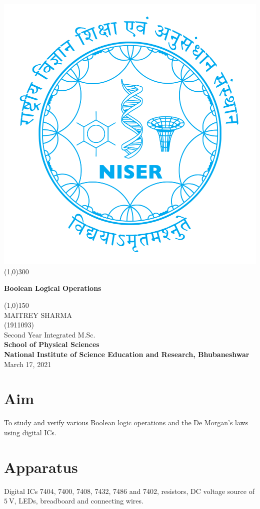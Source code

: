 \begin{titlepage}
\begin{center}
\includegraphics[scale=0.15]{Documents/niser.png}
\line(1,0){300}\\
[2mm]
\begin{large}
\textbf{\huge Boolean Logical Operations}\\ 
\end{large}
\line(1,0){150}\\
[5cm]
\large MAITREY SHARMA\\
\small (1911093)\\
[4.5cm]
Second Year Integrated M.Sc.\\
\textbf{School of Physical Sciences}\\
\textbf{National Institute of Science Education and Research, Bhubaneshwar}\\
\small March 17, 2021
\end{center} 
\end{titlepage}
\newpage
\section{Aim}
\noindent To study and verify various Boolean logic operations and the De Morgan’s 
laws using digital ICs.
\section{Apparatus}
\noindent Digital ICs 7404, 7400, 7408, 7432, 7486 and 7402, resistors, DC voltage source of $\SI{5}{\volt}$, LEDs, breadboard and connecting wires.
